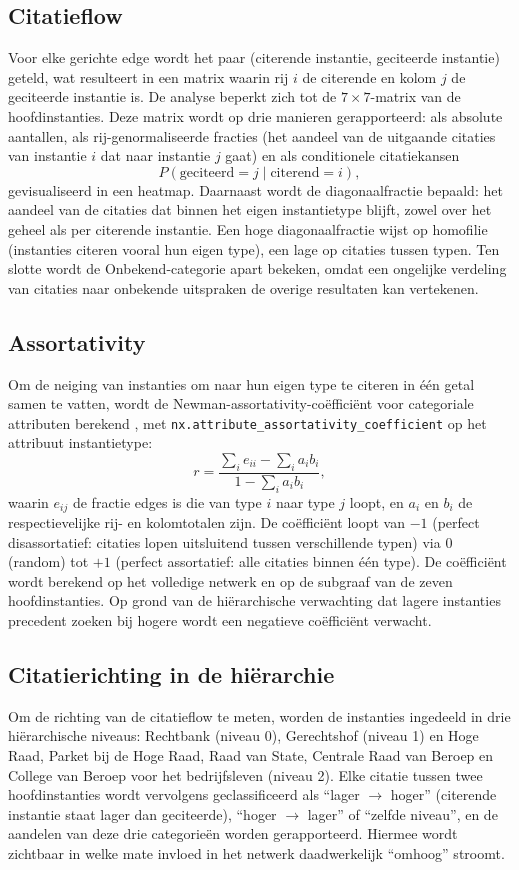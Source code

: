 \documentclass[a4paper, 12pt]{report}
\begin{document}
\subsection{Citatieflow} Voor elke gerichte edge wordt het paar (citerende instantie, geciteerde instantie) geteld, wat resulteert in een matrix waarin rij $i$ de citerende en kolom $j$ de geciteerde instantie is. De analyse beperkt zich tot de $7 \times 7$-matrix van de hoofdinstanties. Deze matrix wordt op drie manieren gerapporteerd: als absolute aantallen, als rij-genormaliseerde fracties (het aandeel van de uitgaande citaties van instantie $i$ dat naar instantie $j$ gaat) en als conditionele citatiekansen
\[
  P(\text{geciteerd}=j \mid \text{citerend}=i),
\]
gevisualiseerd in een heatmap. Daarnaast wordt de diagonaalfractie bepaald: het aandeel van de citaties dat binnen het eigen instantietype blijft, zowel over het geheel als per citerende instantie. Een hoge diagonaalfractie wijst op homofilie (instanties citeren vooral hun eigen type), een lage op citaties tussen typen. Ten slotte wordt de Onbekend-categorie apart bekeken, omdat een ongelijke verdeling van citaties naar onbekende uitspraken de overige resultaten kan vertekenen.

\subsection{Assortativity} Om de neiging van instanties om naar hun eigen type te citeren in één getal samen te vatten, wordt de Newman-assortativity-coëfficiënt voor categoriale attributen berekend \parencite{newman2003}, met \texttt{nx.attribute\_assortativity\_coefficient} op het attribuut instantietype:
\[
  r = \frac{\sum_i e_{ii} - \sum_i a_i b_i}{1 - \sum_i a_i b_i},
\]
waarin $e_{ij}$ de fractie edges is die van type $i$ naar type $j$ loopt, en $a_i$ en $b_i$ de respectievelijke rij- en kolomtotalen zijn. De coëfficiënt loopt van $-1$ (perfect disassortatief: citaties lopen uitsluitend tussen verschillende typen) via $0$ (random) tot $+1$ (perfect assortatief: alle citaties binnen één type). De coëfficiënt wordt berekend op het volledige netwerk en op de subgraaf van de zeven hoofdinstanties. Op grond van de hiërarchische verwachting dat lagere instanties precedent zoeken bij hogere \parencite{mcpherson2001} wordt een negatieve coëfficiënt verwacht.

\subsection{Citatierichting in de hiërarchie} Om de richting van de citatieflow te meten, worden de instanties ingedeeld in drie hiërarchische niveaus: Rechtbank (niveau 0), Gerechtshof (niveau 1) en Hoge Raad, Parket bij de Hoge Raad, Raad van State, Centrale Raad van Beroep en College van Beroep voor het bedrijfsleven (niveau 2). Elke citatie tussen twee hoofdinstanties wordt vervolgens geclassificeerd als ``lager $\rightarrow$ hoger'' (citerende instantie staat lager dan geciteerde), ``hoger $\rightarrow$ lager'' of ``zelfde niveau'', en de aandelen van deze drie categorieën worden gerapporteerd. Hiermee wordt zichtbaar in welke mate invloed in het netwerk daadwerkelijk ``omhoog'' stroomt.
\end{document}
